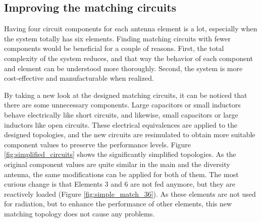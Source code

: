 \subsection{Improving the matching circuits}
\label{sec:matching_circuit}

Having four circuit components for each antenna element is a lot, especially when the system totally has six elements. Finding matching circuits with fewer components would be beneficial for a couple of reasons. First, the total complexity of the system reduces, and that way the behavior of each component and element can be understood more thoroughly. Second, the system is more cost-effective and manufacturable when realized. 

By taking a new look at the designed matching circuits, it can be noticed that there are some unnecessary components. Large capacitors or small inductors behave electrically like short circuits, and likewise, small capacitors or large inductors like open circuits. These electrical equivalences are applied to the designed topologies, and the new circuits are resimulated to obtain more suitable component values to preserve the performance levels. Figure \ref{fig:simplified_circuits} shows the significantly simplified topologies. As the original component values are quite similar in the main and the diversity antenna, the same modifications can be applied for both of them. The most curious change is that Elements 3 and 6 are not fed anymore, but they are reactively loaded (Figure \ref{fig:simple_match_36}). As these elements are not used for radiation, but to enhance the performance of other elements, this new matching topology does not cause any problems. 


